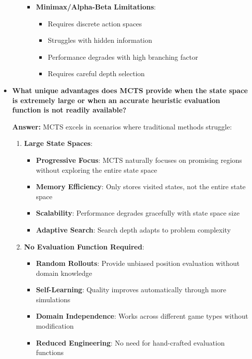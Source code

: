 \begin{itemize}
\begin{enumerate}
\begin{itemize}
            \item \textbf{Minimax/Alpha-Beta Limitations}:
            \begin{itemize}
                \item Requires discrete action spaces
                \item Struggles with hidden information
                \item Performance degrades with high branching factor
                \item Requires careful depth selection
            \end{itemize}
        \end{itemize}
    \end{enumerate}
    
    \item \textbf{What unique advantages does MCTS provide when the state space is extremely large or when an accurate heuristic evaluation function is not readily available?}
    
    \textbf{Answer:} MCTS excels in scenarios where traditional methods struggle:
    
    \begin{enumerate}
        \item \textbf{Large State Spaces}:
        \begin{itemize}
            \item \textbf{Progressive Focus}: MCTS naturally focuses on promising regions without exploring the entire state space
            \item \textbf{Memory Efficiency}: Only stores visited states, not the entire state space
            \item \textbf{Scalability}: Performance degrades gracefully with state space size
            \item \textbf{Adaptive Search}: Search depth adapts to problem complexity
        \end{itemize}
        
        \item \textbf{No Evaluation Function Required}:
        \begin{itemize}
            \item \textbf{Random Rollouts}: Provide unbiased position evaluation without domain knowledge
            \item \textbf{Self-Learning}: Quality improves automatically through more simulations
            \item \textbf{Domain Independence}: Works across different game types without modification
            \item \textbf{Reduced Engineering}: No need for hand-crafted evaluation functions
        \end{itemize}
        

\end{enumerate}
\end{itemize}
